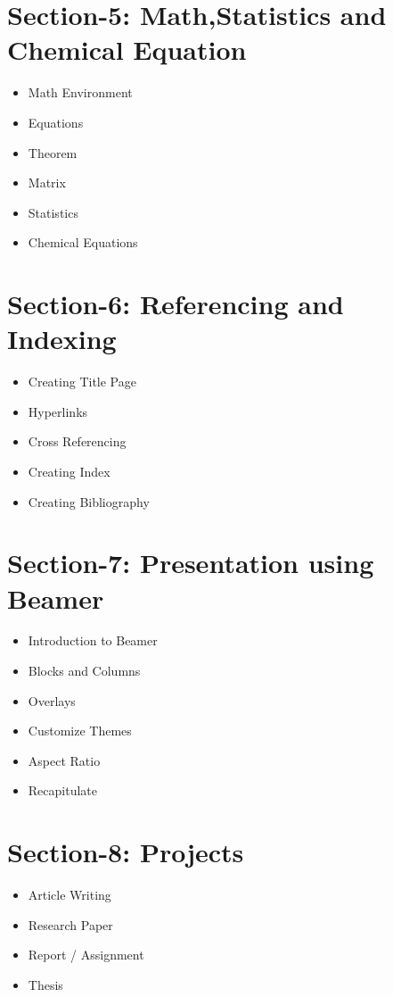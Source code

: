 \documentclass[a4paper, 12pt]{article}
\begin{document}
\section*{Section-5: Math,Statistics and Chemical Equation} 
\begin{itemize}
	\item Math Environment 
	\item Equations 
	\item Theorem
	\item Matrix 
	\item Statistics 
	\item Chemical Equations  
\end{itemize}

\section*{Section-6: Referencing and Indexing} 
\begin{itemize}
	\item Creating Title Page 
	\item Hyperlinks 
	\item Cross Referencing
	\item Creating Index 
	\item Creating Bibliography
\end{itemize}


\section*{Section-7: Presentation using Beamer} 
\begin{itemize}
	\item Introduction to Beamer 
	\item Blocks and Columns 
	\item Overlays 
	\item Customize Themes 
	\item Aspect Ratio 
	\item Recapitulate 
\end{itemize}


\section*{Section-8: Projects} 
\begin{itemize}
	\item Article Writing 
	\item Research Paper  
	\item Report / Assignment 
	\item Thesis 
\end{itemize}
\end{document}

